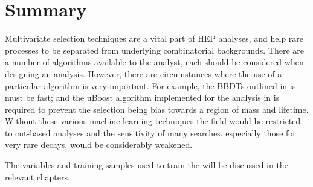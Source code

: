 \section{Summary}
Multivariate selection techniques are a vital part of \gls{HEP} analyses, and help rare
processes to be separated from underlying combinatorial backgrounds.
There are a number of algorithms available to the analyst, each should be considered when designing
an analysis.
However, there are circumstances where the use of a particular algorithm is very important.
For example, the \glspl{BBDT} outlined in  is must be fast; and the uBoost
algorithm implemented for the analysis in  is required to prevent the selection being
bias towards a region of mass and lifetime.
Without these various machine learning techniques the field would be restricted to cut-based
analyses and the sensitivity of many searches, especially those for very rare decays, would be
considerably weakened.

The variables and training samples used to train the \BDTs will be discussed in the relevant
chapters.
